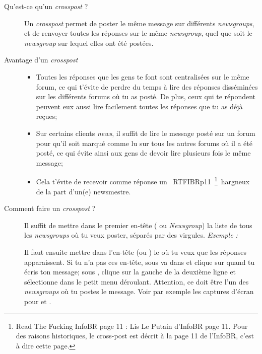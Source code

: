 \begin{description}

\item[Qu'est-ce qu'un \emph{crosspost} ?]
Un \emph{crosspost} permet de poster le même message sur différents \emph{newsgroups}, et de renvoyer toutes les réponses sur le même \emph{newsgroup}, quel
que soit le \emph{newsgroup} sur lequel elles ont été postées.

\item[Avantage d'un \emph{crosspost}]
\begin{itemize}
 \item Toutes les réponses que les gens te font sont centralisées sur le même forum,
       ce qui t'évite de perdre du temps à lire des réponses disséminées
       sur les différents forums où tu as posté.
       De plus, ceux qui te répondent peuvent eux aussi lire facilement toutes les réponses
       que tu as déjà reçues;
 \item Sur certains clients \emph{news}, il suffit de lire le message posté sur un forum
       pour qu'il soit marqué comme lu sur tous les autres forums où il a été posté,
       ce qui évite ainsi aux gens de devoir lire plusieurs fois le même message;
 \item Cela t'évite de recevoir comme réponse un \guillemotleft~RTFIBRp11~\footnote{Read The Fucking InfoBR page 11 : Lis Le Putain d'InfoBR page 11. Pour des raisons historiques, le cross-post est décrit à la page 11 de l'InfoBR, c'est à dire cette page.}~\guillemotright  hargneux de la part d'un(e) newsmestre.
\end{itemize}

\item[Comment faire un \emph{crosspost} ?]
Il suffit de mettre dans le premier en-tête ( ou \emph{Newsgroup}) la liste de tous les \emph{newsgroups} où tu veux
poster, séparés par des virgules. \emph{Exemple :} 

Il faut ensuite mettre dans l'en-tête  (ou ) le  où tu veux que les réponses apparaissent. Si
tu n'a pas ces en-tête, sous  va dans  et clique sur  quand tu écris ton message; sous
, clique sur la gauche de la deuxième ligne et sélectionne  dans le petit menu déroulant. Attention, ce doit être
l'un des \emph{newsgroups} où tu postes le message.
Voir par exemple les captures d'écran pour  et .\\


\end{description}
